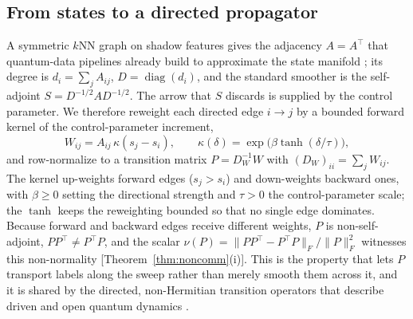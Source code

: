 \documentclass[aps,prresearch,reprint,amsmath,amssymb,nofootinbib,superscriptaddress,floatfix]{revtex4-2}
\theoremstyle{definition}
\theoremstyle{remark}
\theoremstyle{plain}
\begin{document}
\subsection{From states to a directed propagator}
A symmetric $k$NN graph on shadow features gives the adjacency $A=A^\top$ that quantum-data pipelines
already build to approximate the state manifold \cite{coifman2006diffusion}; its degree is
$d_i=\sum_j A_{ij}$, $D=\operatorname{diag}(d_i)$, and the standard smoother is the self-adjoint
$S=D^{-1/2}AD^{-1/2}$. The arrow that $S$ discards is supplied by the control parameter. We therefore
reweight each directed edge $i\!\to\!j$ by a bounded forward kernel of the control-parameter increment,
\begin{equation}
W_{ij}=A_{ij}\,\kappa(s_j-s_i),\qquad \kappa(\delta)=\exp\!\big(\beta\tanh(\delta/\tau)\big),
\label{eq:kernel}
\end{equation}
and row-normalize to a transition matrix $P=D_W^{-1}W$ with $(D_W)_{ii}=\sum_j W_{ij}$. The kernel
up-weights forward edges ($s_j>s_i$) and down-weights backward ones, with $\beta\ge0$ setting the
directional strength and $\tau>0$ the control-parameter scale; the $\tanh$ keeps the reweighting bounded so
that no single edge dominates. Because forward and backward edges receive different weights, $P$ is
non-self-adjoint, $PP^\top\neq P^\top P$, and the scalar $\nu(P)=\|PP^\top-P^\top P\|_F/\|P\|_F^2$ witnesses
this non-normality [Theorem~\ref{thm:noncomm}(i)]. This is the property that lets $P$ transport labels along
the sweep rather than merely smooth them across it, and it is shared by the directed, non-Hermitian
transition operators that describe driven and open quantum dynamics
\cite{chung2005directed,ashida2020nonhermitian}.
\end{document}
